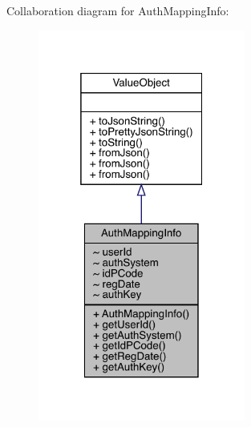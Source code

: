 Collaboration diagram for Auth\+Mapping\+Info\+:
\nopagebreak
\begin{figure}[H]
\begin{center}
\leavevmode
\includegraphics[width=193pt]{classcom_1_1toast_1_1android_1_1gamebase_1_1auth_1_1data_1_1_auth_mapping_info__coll__graph}
\end{center}
\end{figure}
